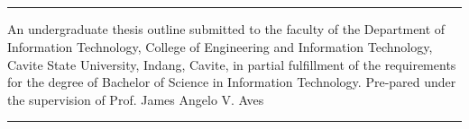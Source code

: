 \begin{center}
	\textbf{\thesistitle{}}

	\leavevmode\\
	\leavevmode\\

	\thesisautors{}

	\leavevmode\\
	\leavevmode\\

	\hrule
	\parbox{\textwidth}{
	\justify
	An undergraduate thesis outline submitted to the faculty of the Department of Information
	Technology, College of Engineering and Information Technology, Cavite State University,
	Indang, Cavite, in partial fulfillment of the requirements for the degree of Bachelor of
	Science in Information Technology. Pre-pared under the supervision of Prof. James Angelo V. Aves}
	\hrule

	\leavevmode\\
	\leavevmode\\
\end{center}
